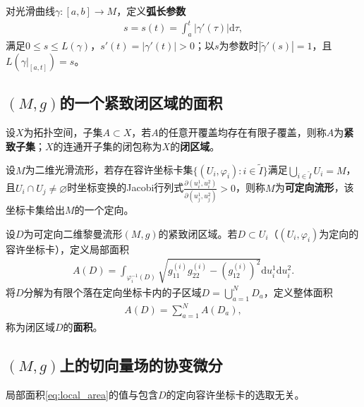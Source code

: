\documentclass[../../main.tex]{subfiles}%
\begin{document}
\begin{definition}
对光滑曲线$\gamma:[a,b]\to M$，定义\textbf{弧长参数}
\begin{align*}
s=s(t)=\int_{a}^{t}|\gamma'(\tau)|\mathrm{d}\tau,
\end{align*}
满足$0\leqslant s\leqslant L(\gamma)$，$s'(t)=|\gamma'(t)|>0$；以$s$为参数时$|\tilde{\gamma}'(s)|=1$，且$L(\gamma|_{[a,t]})=s$。
\end{definition}

\subsection{$(M,g)$的一个紧致闭区域的面积}

\begin{definition}
设$X$为拓扑空间，子集$A\subset X$，若$A$的任意开覆盖均存在有限子覆盖，则称$A$为\textbf{紧致子集}；$X$的连通开子集的闭包称为$X$的\textbf{闭区域}。
\end{definition}

\begin{definition}
设$M$为二维光滑流形，若存在容许坐标卡集$\{(U_i,\varphi_i):i\in\tilde{I}\}$满足$\bigcup_{i\in\tilde{I}}U_i=M$，且$U_i\cap U_j\neq\varnothing $时坐标变换的Jacobi行列式$\frac{\partial(u_i^1,u_i^2)}{\partial(u_j^1,u_j^2)}>0$，则称$M$为\textbf{可定向流形}，该坐标卡集给出$M$的一个定向。
\end{definition}

\begin{definition}
设$D$为可定向二维黎曼流形$(M,g)$的紧致闭区域。若$D\subset U_i$（$(U_i,\varphi_i)$为定向的容许坐标卡），定义局部面积
\begin{align}
A(D)=\int_{\varphi_i^{-1}(D)}\sqrt{g_{11}^{(i)}g_{22}^{(i)}-(g_{12}^{(i)})^2}\mathrm{d}u_i^1\mathrm{d}u_i^2.\label{eq:local_area}
\end{align}
将$D$分解为有限个落在定向坐标卡内的子区域$D=\bigcup_{a=1}^N D_a$，定义整体面积
\begin{align*}
A(D)=\sum_{a=1}^N A(D_a),
\end{align*}
称为闭区域$D$的\textbf{面积}。
\end{definition}

\subsection{$(M,g)$上的切向量场的协变微分}

\begin{theorem}
局部面积\eqref{eq:local_area}的值与包含$D$的定向容许坐标卡的选取无关。
\end{theorem}
\end{document}
